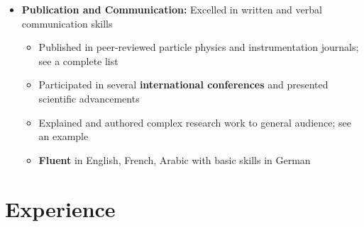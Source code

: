 \documentclass{myfancycv}
\begin{document}
\begin{itemize}
\item{ \textbf{Publication and Communication:} Excelled in written and verbal communication skills
{\begin{itemize}\setlength\itemindent{-2.2em}
\item Published in peer-reviewed particle physics and instrumentation journals; see a complete list \href{https://orcid.org/0000-0002-9169-0793}{}
\item Participated in several {\bf international conferences} and presented scientific advancements
\item Explained and authored complex research work to general audience; see an example \href{http://atlas.cern/updates/physics-briefing/probing-dark-matter-higgs-boson}{}
\item {\bf Fluent} in English, French, Arabic with basic skills in German

\end{itemize}}%
}


\end{itemize}


\section{Experience}
\end{document}
